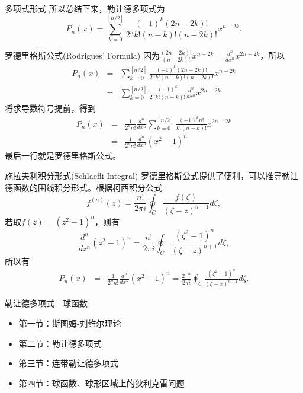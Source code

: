 \documentclass[11pt]{beamer}
\begin{document}
\begin{frame}{多项式形式}
所以总结下来，勒让德多项式为
\begin{equation}
P_n(x) = \sum^{[n/2]}_{k=0} \frac{(-1)^k (2n-2k)!}{2^n k! (n-k)! (n-2k)!} x^{n-2k}.
\end{equation}
\end{frame}

\begin{frame}{罗德里格斯公式(Rodrigues' Formula)}
因为$\frac{(2n-2k)!}{(n-2k)!}x^{n-2k} = \frac{d^n}{dx^n} x^{2n-2k}$，所以
\begin{eqnarray}
P_n(x) &=& \sum^{[n/2]}_{k=0} \frac{(-1)^k (2n-2k)!}{2^n k! (n-k)! (n-2k)!} x^{n-2k}
\nonumber\\
&=& \sum^{[n/2]}_{k=0} \frac{(-1)^k }{2^n k! (n-k)!} \frac{d^n}{dx^n} x^{2n-2k}
\end{eqnarray}
将求导数符号提前，得到
\begin{eqnarray}
P_n(x) &=& \frac{1}{2^n n!} \frac{d^n}{dx^n} \sum^{[n/2]}_{k=0} \frac{(-1)^k  n! }{ k! (n-k)!}  x^{2n-2k}
\nonumber\\
&=& \frac{1}{2^n n!} \frac{d^n}{dx^n} (x^2-1)^n
\end{eqnarray}
最后一行就是罗德里格斯公式。

\end{frame}

\begin{frame}{施拉夫利积分形式(Schlaefli Integral)}
罗德里格斯公式提供了便利，可以推导勒让德函数的围线积分形式。根据柯西积分公式
\begin{equation}
f^{(n)}(z) = \frac{n!}{2\pi i} \oint_C \frac{f(\zeta)}{(\zeta-z)^{n+1}}d\zeta,
\end{equation}
若取$f(z) = (z^2-1)^n$，则有
\begin{equation}
\frac{d^n}{dz^n} (z^2-1)^n = \frac{n!}{2\pi i} \oint_C \frac{(\zeta^2-1)^n}{(\zeta - z)^{n+1}} d \zeta,
\end{equation}
所以有
\begin{eqnarray}
P_n(x) &=& \frac{1}{2^n n!} \frac{d^n}{dx^n} (x^2-1)^n
= \frac{2^{-n}}{2\pi i} \oint_C \frac{(\zeta^2-1)^n}{(\zeta - x)^{n+1}} d \zeta.
\end{eqnarray}

\end{frame}

\begin{frame}{勒让德多项式　球函数}
\begin{itemize}
	\item 第一节：斯图姆-刘维尔理论
	\vspace{1cm}
	\item 第二节：勒让德多项式
	\vspace{1cm}
	\item {\color{blue}第三节：连带勒让德多项式}
	\vspace{1cm}
	\item 第四节：球函数、球形区域上的狄利克雷问题
\end{itemize}
\end{frame}
\end{document}
